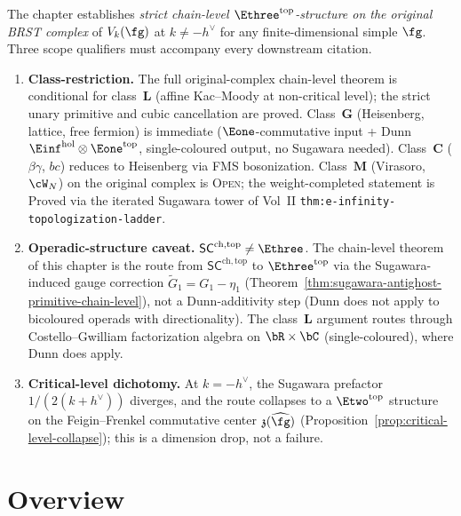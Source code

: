 \begin{remark}
\label{rem:topol-platonic-brst-conformance}
The chapter establishes \emph{strict chain-level
$\Ethree^{\mathrm{top}}$-structure on the original BRST complex}
of $V_k(\fg)$ at $k\ne -h^\vee$ for any finite-dimensional simple
$\fg$. Three scope qualifiers must accompany every downstream
citation.

\begin{enumerate}[label=\textup{(\alph*)}]
\item \textbf{Class-restriction.}
 The full original-complex chain-level theorem is conditional
 for class~$\mathbf{L}$ (affine Kac--Moody at non-critical level);
 the strict unary primitive and cubic cancellation are proved.
 Class~$\mathbf{G}$
 (Heisenberg, lattice, free fermion) is immediate
 ($\Eone$-commutative input + Dunn $\Einf^{\mathrm{hol}}\otimes
 \Eone^{\mathrm{top}}$, single-coloured output, no Sugawara
 needed). Class~$\mathbf{C}$ ($\beta\gamma$, $bc$) reduces to
 Heisenberg via FMS bosonization. Class~$\mathbf{M}$
 (Virasoro, $\cW_N$) on the original complex is
 \textsc{Open}; the weight-completed statement is
 \textup{Proved} via the iterated Sugawara tower of
 Vol~II \texttt{thm:e-infinity-topologization-ladder}.
\item \textbf{Operadic-structure caveat.}
 $\mathsf{SC}^{\mathrm{ch,top}}\ne\Ethree$. The chain-level
 theorem of this chapter is the route from
 $\mathsf{SC}^{\mathrm{ch,top}}$ to $\Ethree^{\mathrm{top}}$
 via the Sugawara-induced gauge correction
 $\widetilde G_1 = G_1 - \eta_1$
 (Theorem~\ref{thm:sugawara-antighost-primitive-chain-level}),
 not a Dunn-additivity step (Dunn does not apply to
 bicoloured operads with directionality). The class~$\mathbf{L}$
 argument routes through Costello--Gwilliam factorization
 algebra on $\bR\times \bC$ (single-coloured), where Dunn does
 apply.
\item \textbf{Critical-level dichotomy.}
 At $k = -h^\vee$, the Sugawara prefactor $1/(2(k+h^\vee))$
 diverges, and the route collapses to a $\Etwo^{\mathrm{top}}$
 structure on the Feigin--Frenkel commutative center
 $\mathfrak{z}(\widehat\fg)$
 (Proposition~\ref{prop:critical-level-collapse}); this is a
 dimension drop, not a failure.
\end{enumerate}
\end{remark}

\section*{Overview}

